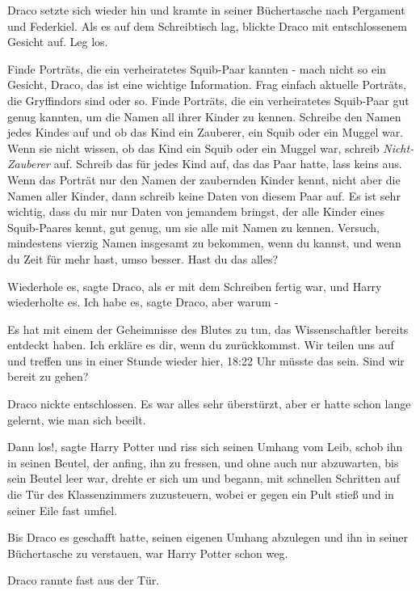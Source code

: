 Draco setzte sich wieder hin und kramte in seiner Büchertasche nach Pergament
und Federkiel. Als es auf dem Schreibtisch lag, blickte Draco mit entschlossenem
Gesicht auf. \glqq{}Leg los.\grqq{}

\glqq{}Finde Porträts, die ein verheiratetes Squib-Paar kannten - mach nicht so
ein Gesicht, Draco, das ist eine wichtige Information. Frag einfach aktuelle
Porträts, die Gryffindors sind oder so. Finde Porträts, die ein verheiratetes
Squib-Paar gut genug kannten, um die Namen all ihrer Kinder zu kennen. Schreibe
den Namen jedes Kindes auf und ob das Kind ein Zauberer, ein Squib oder ein
Muggel war. Wenn sie nicht wissen, ob das Kind ein Squib oder ein Muggel war,
schreib \emph{\glqq{}Nicht-Zauberer\grqq{}} auf. Schreib das für jedes Kind auf,
das das Paar hatte, lass keins aus. Wenn das Porträt nur den Namen der
zaubernden Kinder kennt, nicht aber die Namen aller Kinder, dann schreib keine
Daten von diesem Paar auf. Es ist sehr wichtig, dass du mir nur Daten von
jemandem bringst, der alle Kinder eines Squib-Paares kennt, gut genug, um sie
alle mit Namen zu kennen. Versuch, mindestens vierzig Namen insgesamt zu
bekommen, wenn du kannst, und wenn du Zeit für mehr hast, umso besser. Hast du
das alles?\grqq{}

\glqq{}Wiederhole es\grqq{}, sagte Draco, als er mit dem Schreiben fertig war,
und Harry wiederholte es. \glqq{}Ich habe es\grqq{}, sagte Draco, \glqq{}aber
warum -\grqq{}

\glqq{}Es hat mit einem der Geheimnisse des Blutes zu tun, das Wissenschaftler
bereits entdeckt haben. Ich erkläre es dir, wenn du zurückkommst. Wir teilen uns
auf und treffen uns in einer Stunde wieder hier, 18:22 Uhr müsste das sein. Sind
wir bereit zu gehen?\grqq{}

Draco nickte entschlossen. Es war alles sehr überstürzt, aber er hatte schon
lange gelernt, wie man sich beeilt.

\glqq{}Dann los!\grqq{}, sagte Harry Potter und riss sich seinen Umhang vom
Leib, schob ihn in seinen Beutel, der anfing, ihn zu fressen, und ohne auch nur
abzuwarten, bis sein Beutel leer war, drehte er sich um und begann, mit
schnellen Schritten auf die Tür des Klassenzimmers zuzusteuern, wobei er gegen
ein Pult stieß und in seiner Eile fast umfiel.

Bis Draco es geschafft hatte, seinen eigenen Umhang abzulegen und ihn in seiner
Büchertasche zu verstauen, war Harry Potter schon weg.

Draco rannte fast aus der Tür.
